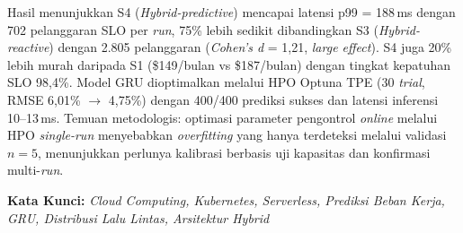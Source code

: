 \begin{center}
    Hasil menunjukkan S4 (\emph{Hybrid-predictive}) mencapai latensi p99 = 188\,ms dengan 702 pelanggaran SLO per \emph{run}, 75\% lebih sedikit dibandingkan S3 (\emph{Hybrid-reactive}) dengan 2.805 pelanggaran (\emph{Cohen's d} = 1,21, \emph{large effect}). S4 juga 20\% lebih murah daripada S1 (\$149/bulan vs \$187/bulan) dengan tingkat kepatuhan SLO 98,4\%. Model GRU dioptimalkan melalui HPO Optuna TPE (30 \emph{trial}, RMSE 6,01\% $\rightarrow$ 4,75\%) dengan 400/400 prediksi sukses dan latensi inferensi 10--13\,ms. Temuan metodologis: optimasi parameter pengontrol \emph{online} melalui HPO \emph{single-run} menyebabkan \emph{overfitting} yang hanya terdeteksi melalui validasi $n=5$, menunjukkan perlunya kalibrasi berbasis uji kapasitas dan konfirmasi multi-\emph{run}.

    \vspace{0.5cm}

    \textbf{Kata Kunci:} \emph{Cloud Computing, Kubernetes, Serverless, Prediksi Beban Kerja, GRU, Distribusi Lalu Lintas, Arsitektur Hybrid}

\end{center}

\clearpage
